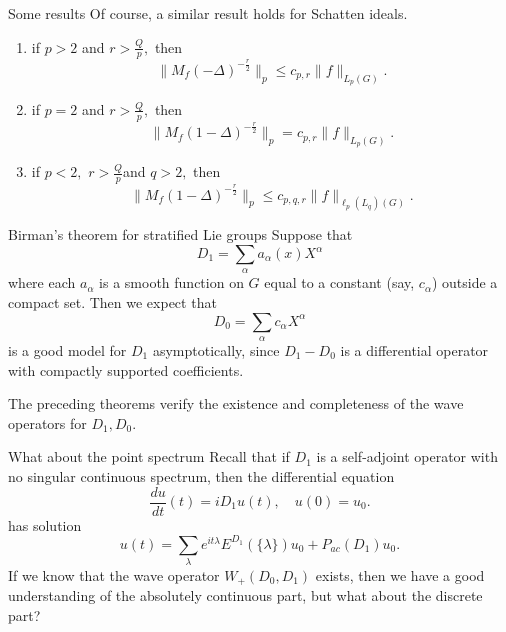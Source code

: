\documentclass{beamer}
\numberwithin{equation}{section}
\theoremstyle{plain}
\theoremstyle{plain}
\theoremstyle{definition}
\theoremstyle{plain}
\theoremstyle{plain}
\theoremstyle{definition}
\begin{document}
\begin{frame}{Some results}
Of course, a similar result holds for Schatten ideals.

\begin{theorem}\label{cwikel schatten_theorem}
\begin{enumerate}[{\rm (i)}]
\item if $p>2$ and $r>\frac{Q}{p},$ then
$$\|M_f(-\Delta)^{-\frac{r}{2}}\|_p\leq c_{p,r}\|f\|_{L_p(G)}.$$
\item if $p=2$ and $r>\frac{Q}{p},$ then
$$\|M_f(1-\Delta)^{-\frac{r}{2}}\|_p=c_{p,r}\|f\|_{L_p(G)}.$$
\item if $p<2,$ $r>\frac{Q}{p}$and $q>2,$ then
$$\|M_f(1-\Delta)^{-\frac{r}{2}}\|_p\leq c_{p,q,r}\|f\|_{\ell_p(L_q)(G)}.$$
\end{enumerate}
\end{theorem}
\end{frame}


\begin{frame}{Birman's theorem for stratified Lie groups}
  Suppose that
  \[
      D_1 = \sum_{\alpha} a_{\alpha}(x)X^{\alpha}
  \]
  where each $a_{\alpha}$ is a smooth function on $G$ equal to a constant (say, $c_{\alpha}$) outside a compact set.
  Then we expect that
  \[
      D_0 = \sum_{\alpha} c_{\alpha}X^{\alpha}
  \]
  is a good model for $D_1$ asymptotically, since $D_1-D_0$ is a differential operator with compactly supported coefficients.

  The preceding theorems verify the existence and completeness of the wave operators for $D_1,D_0.$
\end{frame}

\begin{frame}{What about the point spectrum}
Recall that if $D_1$ is a self-adjoint operator with no singular continuous spectrum, then the differential equation
  \[
    \frac{du}{dt}(t) = iD_1u(t),\quad u(0) = u_0.
  \]
  has solution
  \[
    u(t) = \sum_{\lambda} e^{it\lambda}E^{D_1}(\{\lambda\})u_0 + P_{ac}(D_1)u_0.
  \]
  If we know that the wave operator $W_+(D_0,D_1)$ exists, then we have a good understanding of the absolutely continuous part, but what about the discrete part?
\end{frame}
\end{document}
